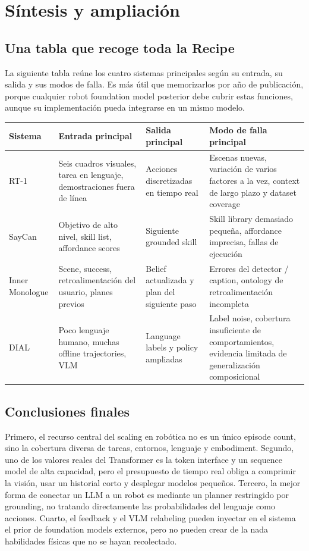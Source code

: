 \section{Síntesis y ampliación}

\subsection{Una tabla que recoge toda la Recipe}

La siguiente tabla reúne los cuatro sistemas principales según su entrada, su salida y sus modos de falla. Es más útil que memorizarlos por año de publicación, porque cualquier robot foundation model posterior debe cubrir estas funciones, aunque su implementación pueda integrarse en un mismo modelo.

\begin{longtable}{@{}L{0.16\textwidth}L{0.22\textwidth}L{0.23\textwidth}L{0.27\textwidth}@{}}
\toprule
Sistema & Entrada principal & Salida principal & Modo de falla principal \\
\midrule
RT-1 & Seis cuadros visuales, tarea en lenguaje, demostraciones fuera de línea & Acciones discretizadas en tiempo real & Escenas nuevas, variación de varios factores a la vez, context de largo plazo y dataset coverage \\
SayCan & Objetivo de alto nivel, skill list, affordance scores & Siguiente grounded skill & Skill library demasiado pequeña, affordance imprecisa, fallas de ejecución \\
Inner Monologue & Scene, success, retroalimentación del usuario, planes previos & Belief actualizada y plan del siguiente paso & Errores del detector / caption, ontology de retroalimentación incompleta \\
DIAL & Poco lenguaje humano, muchas offline trajectories, VLM & Language labels y policy ampliadas & Label noise, cobertura insuficiente de comportamientos, evidencia limitada de generalización composicional \\
\bottomrule
\end{longtable}

\subsection{Conclusiones finales}

Primero, el recurso central del scaling en robótica no es un único episode count, sino la cobertura diversa de tareas, entornos, lenguaje y embodiment. Segundo, uno de los valores reales del Transformer es la token interface y un sequence model de alta capacidad, pero el presupuesto de tiempo real obliga a comprimir la visión, usar un historial corto y desplegar modelos pequeños. Tercero, la mejor forma de conectar un LLM a un robot es mediante un planner restringido por grounding, no tratando directamente las probabilidades del lenguaje como acciones. Cuarto, el feedback y el VLM relabeling pueden inyectar en el sistema el prior de foundation models externos, pero no pueden crear de la nada habilidades físicas que no se hayan recolectado.

